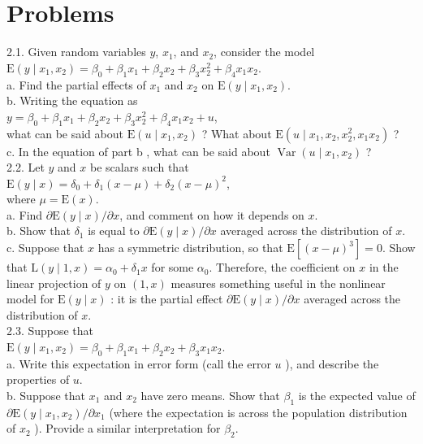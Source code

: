 \documentclass[10pt]{article}
\begin{document}
\section*{Problems}
2.1. Given random variables $y$, $x_{1}$, and $x_{2}$, consider the model\\
$\mathrm{E}\left(y \mid x_{1}, x_{2}\right)=\beta_{0}+\beta_{1} x_{1}+\beta_{2} x_{2}+\beta_{3} x_{2}^{2}+\beta_{4} x_{1} x_{2}$.\\
a. Find the partial effects of $x_{1}$ and $x_{2}$ on $\mathrm{E}\left(y \mid x_{1}, x_{2}\right)$.\\
b. Writing the equation as\\
$y=\beta_{0}+\beta_{1} x_{1}+\beta_{2} x_{2}+\beta_{3} x_{2}^{2}+\beta_{4} x_{1} x_{2}+u$,\\
what can be said about $\mathrm{E}\left(u \mid x_{1}, x_{2}\right)$ ? What about $\mathrm{E}\left(u \mid x_{1}, x_{2}, x_{2}^{2}, x_{1} x_{2}\right)$ ?\\
c. In the equation of part b , what can be said about $\operatorname{Var}\left(u \mid x_{1}, x_{2}\right)$ ?\\
2.2. Let $y$ and $x$ be scalars such that\\
$\mathrm{E}(y \mid x)=\delta_{0}+\delta_{1}(x-\mu)+\delta_{2}(x-\mu)^{2}$,\\
where $\mu=\mathrm{E}(x)$.\\
a. Find $\partial \mathrm{E}(y \mid x) / \partial x$, and comment on how it depends on $x$.\\
b. Show that $\delta_{1}$ is equal to $\partial \mathrm{E}(y \mid x) / \partial x$ averaged across the distribution of $x$.\\
c. Suppose that $x$ has a symmetric distribution, so that $\mathrm{E}\left[(x-\mu)^{3}\right]=0$. Show that $\mathrm{L}(y \mid 1, x)=\alpha_{0}+\delta_{1} x$ for some $\alpha_{0}$. Therefore, the coefficient on $x$ in the linear projection of $y$ on $(1, x)$ measures something useful in the nonlinear model for $\mathrm{E}(y \mid x)$ : it is the partial effect $\partial \mathrm{E}(y \mid x) / \partial x$ averaged across the distribution of $x$.\\
2.3. Suppose that\\
$\mathrm{E}\left(y \mid x_{1}, x_{2}\right)=\beta_{0}+\beta_{1} x_{1}+\beta_{2} x_{2}+\beta_{3} x_{1} x_{2}$.\\
a. Write this expectation in error form (call the error $u$ ), and describe the properties of $u$.\\
b. Suppose that $x_{1}$ and $x_{2}$ have zero means. Show that $\beta_{1}$ is the expected value of $\partial \mathrm{E}\left(y \mid x_{1}, x_{2}\right) / \partial x_{1}$ (where the expectation is across the population distribution of $x_{2}$ ). Provide a similar interpretation for $\beta_{2}$.\\
\end{document}
